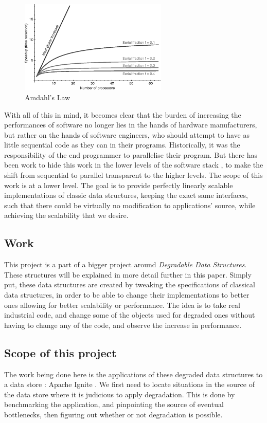 \documentclass[conference]{IEEEtran}
\begin{document}
\begin{figure}[!ht]
\centerline{\includegraphics[width=70mm]{amdahl.png}}
\caption{Amdahl's Law}
\label{amdahl}
\end{figure}

With all of this in mind, it becomes clear that the burden of increasing the performances of software no longer lies in the hands of hardware manufacturers, but rather on the hands of software engineers, who should attempt to have as little sequential code as they can in their programs.
Historically, it was the responsibility of the end programmer to parallelise their program. But there has been work to hide this work in the lower levels of the software stack \cite{scalable}, to make the shift from sequential to parallel transparent to the higher levels. The scope of this work is at a lower level. The goal is to provide perfectly linearly scalable implementations of classic data structures, keeping the exact same interfaces, such that there could be virtually no modification to applications' source, while achieving the scalability that we desire.


\subsection{Work}
This project is a part of a bigger project around \textit{Degradable Data Structures}. These structures will be explained in more detail further in this paper. Simply put, these data structures are created by tweaking the specifications of classical data structures, in order to be able to change their implementations to better ones allowing for better scalability or performance. The idea is to take real industrial code, and change some of the objects used for degraded ones without having to change any of the code, and observe the increase in performance.

\subsection{Scope of this project}
The work being done here is the applications of these degraded data structures to a data store : Apache Ignite \cite{ignite}. We first need to locate situations in the source of the data store where it is judicious to apply degradation. This is done by benchmarking the application, and pinpointing the source of eventual bottlenecks, then figuring out whether or not degradation is possible.
\end{document}

